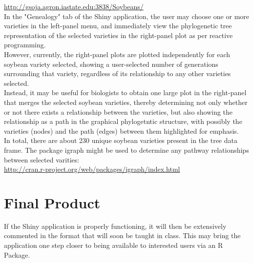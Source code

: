 \documentclass{article}\usepackage[]{graphicx}\usepackage[]{color}
\begin{document}
\hyperref[shinySBLink]{http://gsoja.agron.iastate.edu:3838/Soybeans/}\\

\noindent
In the "Genealogy" tab of the Shiny application, the user may choose one or more varieties in the left-panel menu, and immediately view the phylogenetic tree representation of the selected varieties in the right-panel plot as per reactive programming.\\

However, currently, the right-panel plots are plotted independently for each soybean variety selected, showing a user-selected number of generations surrounding that variety, regardless of its relationship to any other varieties selected.\\

Instead, it may be useful for biologists to obtain one large plot in the right-panel that merges the selected soybean varieties, thereby determining not only whether or not there exists a relationship between the varieties, but also showing the relationship as a path in the graphical phylogetntic structure, with possibly the varieties (nodes) and the path (edges) between them highlighted for emphasis.\\

In total, there are about 230 unique soybean varieties present in the tree data frame. The package igraph might be used to determine any pathway relationships between selected varities:\\

\hyperref[igraphLink]{http://cran.r-project.org/web/packages/igraph/index.html}\\

\noindent

\section*{Final Product}

If the Shiny application is properly functioning, it will then be extensively commented in the format that will soon be taught in class. This may bring the application one step closer to being available to interested users via an R Package.
\end{document}
